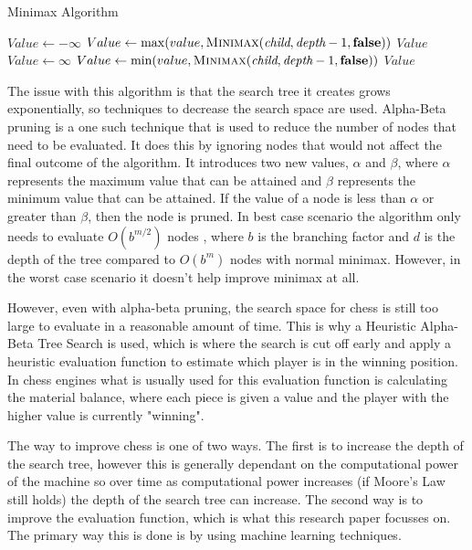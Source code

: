 \begin{algorithm}[h]
    \caption{Minimax Algorithm}
    \begin{algorithmic}
        \State \Return {}
        \EndIf
        \State $Value \gets -\infty$
        \State $Value \gets \max(value, \textsc{Minimax}(\textit{child}, \textit{depth} - 1, \textbf{false}))$
        \EndFor
        \State \Return $Value$
        \Else
        \State $Value \gets \infty$
        \State $Value \gets \min(value, \textsc{Minimax}(\textit{child}, \textit{depth} - 1, \textbf{false}))$
        \EndFor
        \State \Return $Value$
        \EndIf
        \EndFunction
    \end{algorithmic}
\end{algorithm}
The issue with this algorithm is that the search tree it creates grows exponentially, so techniques to decrease the search space are used. Alpha-Beta pruning is a one such technique that is used to reduce the number of nodes that need to be evaluated. It does this by ignoring nodes that would not affect the final outcome of the algorithm. It introduces two new values, ${\alpha}$ and ${\beta}$, where ${\alpha}$ represents the maximum value that can be attained and ${\beta}$ represents the minimum value that can be attained. If the value of a node is less than ${\alpha}$ or greater than ${\beta}$, then the node is pruned. In best case scenario the algorithm only needs to evaluate ${O(b^{m/2})}$ nodes \cite{russellArtificialIntelligenceModern2022}, where ${b}$ is the branching factor and ${d}$ is the depth of the tree compared to ${O(b^m)}$ nodes with normal minimax. However, in the worst case scenario it doesn't help improve minimax at all.

However, even with alpha-beta pruning, the search space for chess is still too large to evaluate in a reasonable amount of time.  This is why a Heuristic Alpha-Beta Tree Search is used, which is where the search is cut off early and apply a heuristic evaluation function to estimate which player is in the winning position. In chess engines what is usually used for this evaluation function is calculating the material balance, where each piece is given a value and the player with the higher value is currently "winning".

The way to improve chess is one of two ways. The first is to increase the depth of the search tree, however this is generally dependant on the computational power of the machine so over time as computational power increases (if Moore's Law still holds) the depth of the search tree can increase. The second way is to improve the evaluation function, which is what this research paper focusses on. The primary way this is done is by using machine learning techniques. 

